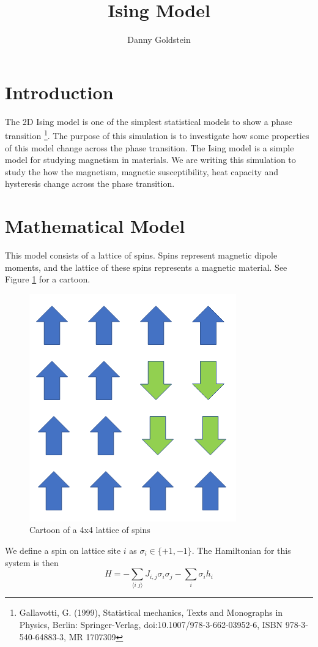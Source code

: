 \documentclass[]{scrartcl}
\title{Ising Model}
\author{Danny Goldstein}
\begin{document}
	
	\maketitle
	
	\section{Introduction}
	
	The 2D Ising model is one of the simplest statistical models to show a phase transition \footnote{Gallavotti, G. (1999), Statistical mechanics, Texts and Monographs in Physics, Berlin: Springer-Verlag, doi:10.1007/978-3-662-03952-6, ISBN 978-3-540-64883-3, MR 1707309}. The purpose of this simulation is to investigate how some properties of this model change across the phase transition. The Ising model is a simple model for studying magnetism in materials. We are writing this simulation to study the how the magnetism, magnetic susceptibility, heat capacity and hysteresis change across the phase transition.
	
	
	\section{Mathematical Model}
	This model consists of a lattice of spins. Spins represent magnetic dipole moments, and the lattice of these spins represents a magnetic material. See Figure \ref{fig:cartoon1} for a cartoon.

\begin{figure}[ht]
	\centering
	\includegraphics[width = 0.5\linewidth]{IsingCartoon}
	\caption{Cartoon of a 4x4 lattice of spins}
	\label{fig:cartoon1}
\end{figure}
	
	We define a spin on lattice site $i$ as $\sigma_i \in \{+1, -1\}$.
	The Hamiltonian for this system is then 
	$$H = -\sum_{\langle i \;  j \rangle} J_{i,j} \sigma_i \sigma_j -\sum_i \sigma_i h_i$$
	
\end{document}
